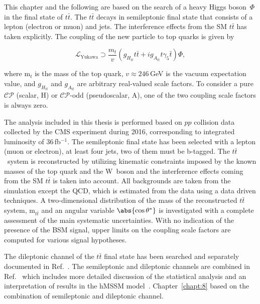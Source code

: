 This chapter and the following are based on the search of a heavy Higgs boson~$\Phi$ in the final state of $t\bar t$. The $t\bar t$ decays in semileptonic final state that consists of a lepton (electron or muon) and jets. The interference effects from the SM $t\bar t$ has taken explicitly. 
The coupling of the new particle to top quarks is given by
\begin{linenomath}
\begin{equation}
 \label{Eq:Coupling}
 \mathcal L_\text{Yukawa} \supset \frac{m_t}{v} \left(g_{H_{tt}} t\bar t+ ig_{A_{tt}} t \gamma_5 \bar t\right) \Phi,
\end{equation}
\end{linenomath}
where m$_t$ is the mass of the top quark, $v \approx 246$\,GeV{} is the vacuum expectation value, and $g_{H_{tt}}$ and $g_{A_{tt}}$ are arbitrary real-valued scale factors.
To consider a pure $\mathcal{CP}$ (scalar, H) or $\mathcal{CP}$-odd (pseudoscalar, A), one of the two coupling scale factors is always zero.

The analysis included in this thesis is performed based on $pp$ collision data collected by the CMS experiment during 2016, corresponding to integrated luminosity of 36\,fb$^{-1}$. The semileptonic final state has been selected with a lepton (muon or electron), at least four jets, two of them must be b-tagged. The $t\bar t$~system is reconstructed by utilizing kinematic constraints imposed by the known masses of the top quark and the W~boson and the interference effects coming from the SM $t\bar t$ is taken into account. All backgrounds are taken from the simulation except the QCD, which is estimated from the data using a data driven techniques. A two-dimensional distribution of the mass of the reconstructed $t\bar t$ system, m$_{t\bar t}$ and an angular variable $\abs{\cos\theta^*}$ is investigated with a complete assessment of the main systematic uncertainties. With no indication of the presence of the BSM signal, upper limits on the coupling scale factors are computed for various signal hypotheses. 

The dileptonic channel of the $t\bar t$ final state has been searched and separately documented in Ref.~\cite{CMS-AN-16-164}. The semileptonic and dileptonic channels are combined in Ref.~\cite{CMS-AN-17-202} which includes more detailed discussion of the statistical analysis and an interpretation of results in the hMSSM model~\cite{Djouadi:2013uqa}. Chapter~\ref{chapt:8} based on the combination of semileptonic and dileptonic channel.


